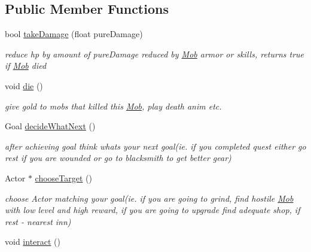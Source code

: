 \subsection*{Public Member Functions}
\begin{DoxyCompactItemize}
\item 
bool \hyperlink{class_mob_af124fd088b64d10dde3eef2f5ec9f139}{take\+Damage} (float pure\+Damage)\hypertarget{class_mob_af124fd088b64d10dde3eef2f5ec9f139}{}\label{class_mob_af124fd088b64d10dde3eef2f5ec9f139}

\begin{DoxyCompactList}\small\item\em reduce hp by amount of pure\+Damage reduced by \hyperlink{class_mob}{Mob} armor or skills, returns true if \hyperlink{class_mob}{Mob} died \end{DoxyCompactList}\item 
void \hyperlink{class_mob_a07546ec7a5028846090157d51095904b}{die} ()\hypertarget{class_mob_a07546ec7a5028846090157d51095904b}{}\label{class_mob_a07546ec7a5028846090157d51095904b}

\begin{DoxyCompactList}\small\item\em give gold to mobs that killed this \hyperlink{class_mob}{Mob}, play death anim etc. \end{DoxyCompactList}\item 
Goal \hyperlink{class_mob_ac949a1e6a9a60efd432adea5a4abdeb8}{decide\+What\+Next} ()\hypertarget{class_mob_ac949a1e6a9a60efd432adea5a4abdeb8}{}\label{class_mob_ac949a1e6a9a60efd432adea5a4abdeb8}

\begin{DoxyCompactList}\small\item\em after achieving goal think what\textquotesingle{}s your next goal(ie. if you completed quest either go rest if you are wounded or go to blacksmith to get better gear) \end{DoxyCompactList}\item 
Actor $\ast$ \hyperlink{class_mob_a80987418449007527dea30234099c301}{choose\+Target} ()\hypertarget{class_mob_a80987418449007527dea30234099c301}{}\label{class_mob_a80987418449007527dea30234099c301}

\begin{DoxyCompactList}\small\item\em choose Actor matching your goal(ie. if you are going to grind, find hostile \hyperlink{class_mob}{Mob} with low level and high reward, if you are going to upgrade find adequate shop, if rest -\/ nearest inn) \end{DoxyCompactList}\item 
void \hyperlink{class_mob_af89dfe24c4bea6d4fea6affd0b752c04}{interact} ()\hypertarget{class_mob_af89dfe24c4bea6d4fea6affd0b752c04}{}\label{class_mob_af89dfe24c4bea6d4fea6affd0b752c04}


\end{DoxyCompactItemize}
